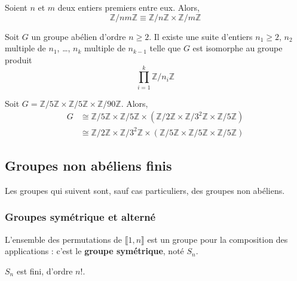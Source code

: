 
	\begin{theorem}[Chinois]
		Soient $n$ et $m$ deux entiers premiers entre eux. Alors,
		\[ \mathbb{Z}/nm\mathbb{Z} \equiv \mathbb{Z}/n\mathbb{Z} \times \mathbb{Z}/m\mathbb{Z} \]
	\end{theorem}


	\begin{theorem}[Kronecker]
		Soit $G$ un groupe abélien d'ordre $n \geq 2$. Il existe une suite d'entiers $n_1 \geq 2$, $n_2$ multiple de $n_1$, \dots, $n_k$ multiple de $n_{k-1}$ telle que $G$ est isomorphe au groupe produit
		\[ \prod_{i=1}^k \mathbb{Z}/n_i\mathbb{Z} \]
	\end{theorem}

	\begin{example}
		Soit $G = \mathbb{Z}/5\mathbb{Z} \times \mathbb{Z}/5\mathbb{Z} \times \mathbb{Z}/90\mathbb{Z}$. Alors,
		\begin{align*}
			G &\cong \mathbb{Z}/5\mathbb{Z} \times \mathbb{Z}/5\mathbb{Z} \times (\mathbb{Z}/2\mathbb{Z} \times \mathbb{Z}/3^2\mathbb{Z} \times \mathbb{Z}/5\mathbb{Z}) \\
			&\cong \mathbb{Z}/2\mathbb{Z} \times \mathbb{Z}/3^2\mathbb{Z} \times (\mathbb{Z}/5\mathbb{Z} \times \mathbb{Z}/5\mathbb{Z} \times \mathbb{Z}/5\mathbb{Z})
		\end{align*}
	\end{example}

	\subsection{Groupes non abéliens finis}

	Les groupes qui suivent sont, sauf cas particuliers, des groupes non abéliens.

	\subsubsection{Groupes symétrique et alterné}


	\begin{definition}
		L'ensemble des permutations de $\llbracket 1, n \rrbracket$ est un groupe pour la composition des applications : c'est le \textbf{groupe symétrique}, noté $S_n$.
	\end{definition}

	\begin{remark}
		$S_n$ est fini, d'ordre $n!$.
	\end{remark}

